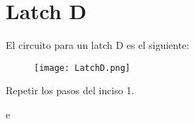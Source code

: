 \section{Latch D \label{sec:s2}}

\begin{center}
	\begin{minipage}{12cm}
		\begin{tcolorbox}[title=Actividad 2]
			El circuito para un latch D es el siguiente:
			\begin{figure}[ht]
				\centering
				\texttt{[image: LatchD.png]}
			\end{figure}
			Repetir los pasos del inciso 1.
		\end{tcolorbox}	
	\end{minipage}
\end{center}

e